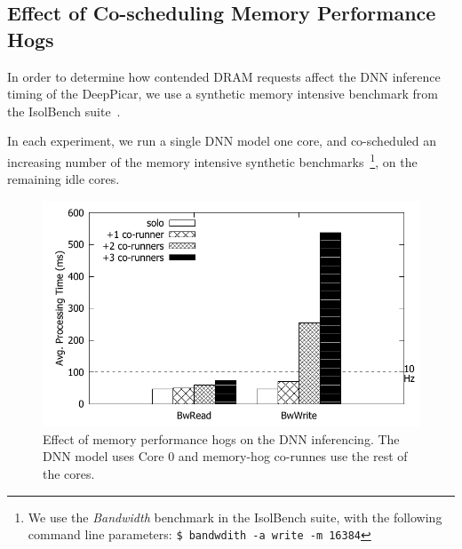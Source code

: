 
\subsection{Effect of Co-scheduling Memory Performance Hogs}

In order to determine how contended DRAM requests affect the DNN
inference timing of the DeepPicar, we use a synthetic memory
intensive benchmark from the IsolBench suite~\cite{Valsan2016}.

In each experiment, we run a single DNN model one core, and
co-scheduled an increasing number of the memory intensive synthetic
benchmarks~\footnote{We use the \emph{Bandwidth} benchmark in the
  IsolBench suite, with the following command line parameters: \texttt{\$
  bandwdith -a write -m 16384}}, on the remaining idle cores.

\begin{figure}[h]
  \centering
  \includegraphics[width=.45\textwidth]{figs/perf_vs_bandwidth}
  \caption{Effect of memory performance hogs on the DNN
    inferencing. The DNN model uses Core 0 and memory-hog co-runnes
    use the rest of the cores.}
  \label{fig:}
\end{figure}


